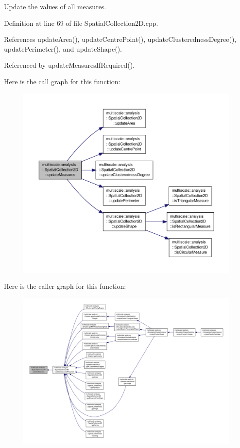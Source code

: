 Update the values of all measures. 



Definition at line 69 of file Spatial\-Collection2\-D.\-cpp.



References update\-Area(), update\-Centre\-Point(), update\-Clusteredness\-Degree(), update\-Perimeter(), and update\-Shape().



Referenced by update\-Measures\-If\-Required().



Here is the call graph for this function\-:\nopagebreak
\begin{figure}[H]
\begin{center}
\leavevmode
\includegraphics[width=350pt]{classmultiscale_1_1analysis_1_1SpatialCollection2D_a8e5a2af581895142da9b50eeeabeb7be_cgraph}
\end{center}
\end{figure}




Here is the caller graph for this function\-:\nopagebreak
\begin{figure}[H]
\begin{center}
\leavevmode
\includegraphics[width=350pt]{classmultiscale_1_1analysis_1_1SpatialCollection2D_a8e5a2af581895142da9b50eeeabeb7be_icgraph}
\end{center}
\end{figure}


